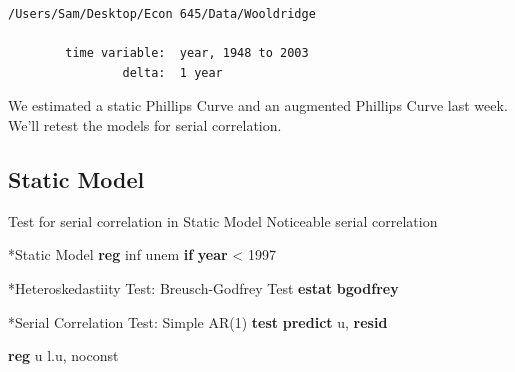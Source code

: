 \documentclass[
]{book}
\newenvironment{Shaded}{\begin{snugshade}}{\end{snugshade}}
\newcommand{\FunctionTok}[1]{\textcolor[rgb]{0.13,0.29,0.53}{\textbf{#1}}}
\newcommand{\KeywordTok}[1]{\textcolor[rgb]{0.13,0.29,0.53}{\textbf{#1}}}
\newcommand{\NormalTok}[1]{#1}
\newcommand{\OtherTok}[1]{\textcolor[rgb]{0.56,0.35,0.01}{#1}}
\begin{document}
\begin{verbatim}
/Users/Sam/Desktop/Econ 645/Data/Wooldridge

        time variable:  year, 1948 to 2003
                delta:  1 year
\end{verbatim}

We estimated a static Phillips Curve and an augmented Phillips Curve last week.
We'll retest the models for serial correlation.

\subsection*{Static Model}\label{static-model}

Test for serial correlation in Static Model
Noticeable serial correlation

\begin{Shaded}
\begin{Highlighting}[]
\NormalTok{*Static Model}
\KeywordTok{reg}\NormalTok{ inf unem }\KeywordTok{if} \FunctionTok{year}\NormalTok{ \textless{} 1997}

\NormalTok{*Heteroskedastiity Test: Breusch{-}Godfrey Test}
\KeywordTok{estat} \KeywordTok{bgodfrey}

\NormalTok{*Serial Correlation Test: Simple AR(1) }\KeywordTok{test}
\KeywordTok{predict}\NormalTok{ u, }\KeywordTok{resid}

\KeywordTok{reg}\NormalTok{ u }\OtherTok{l}\NormalTok{.u, noconst}
\end{Highlighting}
\end{Shaded}
\end{document}
